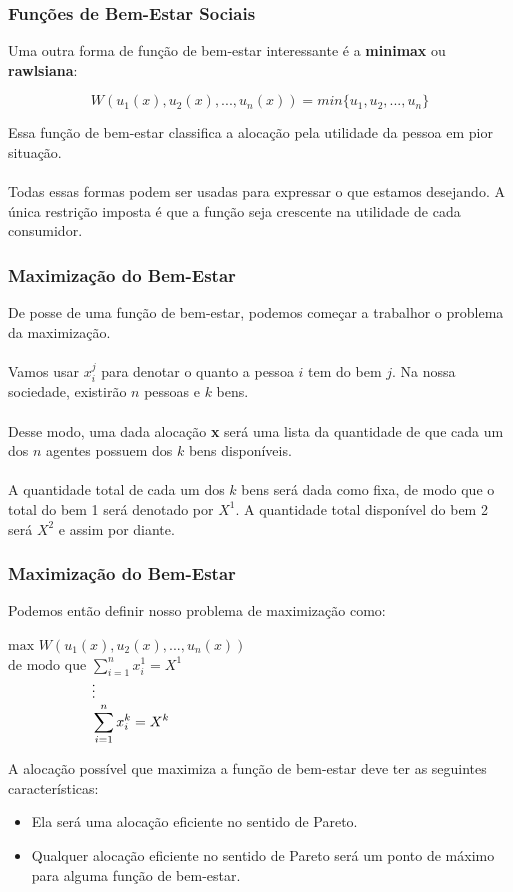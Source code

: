 \documentclass{beamer}[10]
\begin{document}
\begin{frame}
	\frametitle{Funções de Bem-Estar Sociais}

	Uma outra forma de função de bem-estar interessante é a \textbf{minimax} ou \textbf{rawlsiana}:

	$$ W(u_1(x),u_2(x),...,u_n(x)) = min\{ u_1, u_2, ..., u_n \} $$

	Essa função de bem-estar classifica a alocação pela utilidade da pessoa em pior situação.
	\\~\\
	Todas essas formas podem ser usadas para expressar o que estamos desejando. A única restrição imposta é que a função seja crescente na utilidade de cada consumidor.

\end{frame}

\begin{frame}
	\frametitle{Maximização do Bem-Estar}

	De posse de uma função de bem-estar, podemos começar a trabalhor o problema da maximização.
	\\~\\
	Vamos usar $x_i^j$ para denotar o quanto a pessoa $i$ tem do bem $j$. Na nossa sociedade, existirão $n$ pessoas e $k$ bens.
	\\~\\
	Desse modo, uma dada alocação \textbf{x} será uma lista da quantidade de que cada um dos $n$ agentes possuem dos $k$ bens disponíveis.
	\\~\\
	A quantidade total de cada um dos $k$ bens será dada como fixa, de modo que o total do bem 1 será denotado por $X^1$. A quantidade total disponível do bem 2 será $X^2$ e assim por diante.

\end{frame}

\begin{frame}
	\frametitle{Maximização do Bem-Estar}

	Podemos então definir nosso problema de maximização como:

	\begin{center}
		$\textrm{max } W(u_1(x),u_2(x),...,u_n(x))$ \\
		$\textrm{de modo que } \displaystyle \sum^n_{i = 1} x^1_i = X^1$ \\
		$\textrm{\hphantom{de modo que }} \vdots$ \\
		$\textrm{\hphantom{de modo que }}\displaystyle \sum^n_{i = 1} x^k_i = X^k$
	\end{center}
	
	A alocação possível que maximiza a função de bem-estar deve ter as seguintes características:
	\begin{itemize}
		\item Ela será uma alocação eficiente no sentido de Pareto.
		\item Qualquer alocação eficiente no sentido de Pareto será um ponto de máximo para alguma função de bem-estar.
	\end{itemize}

\end{frame}
\end{document}
